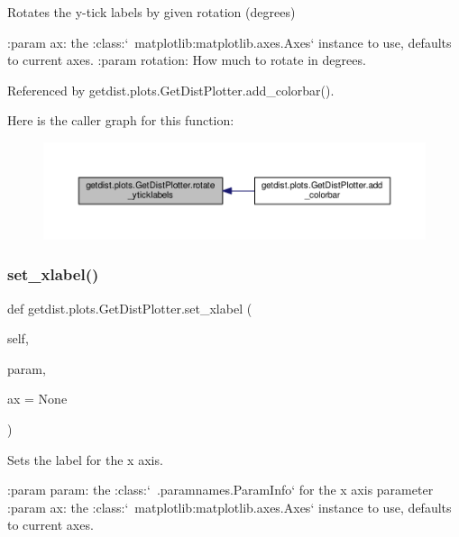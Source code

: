 \begin{DoxyVerb}Rotates the y-tick labels by given rotation (degrees)

:param ax: the :class:`~matplotlib:matplotlib.axes.Axes` instance to use, defaults to current axes.
:param rotation: How much to rotate in degrees.
\end{DoxyVerb}
 

Referenced by getdist.\+plots.\+Get\+Dist\+Plotter.\+add\+\_\+colorbar().

Here is the caller graph for this function\+:
\nopagebreak
\begin{figure}[H]
\begin{center}
\leavevmode
\includegraphics[width=350pt]{classgetdist_1_1plots_1_1GetDistPlotter_a695a45a9dff3c9be3b44d4b652dfc2df_icgraph}
\end{center}
\end{figure}
\mbox{\label{classgetdist_1_1plots_1_1GetDistPlotter_a307e4b542216e36e71550a6d34a36f49}} 
\subsubsection{\texorpdfstring{set\+\_\+xlabel()}{set\_xlabel()}}
{\footnotesize\ttfamily def getdist.\+plots.\+Get\+Dist\+Plotter.\+set\+\_\+xlabel (\begin{DoxyParamCaption}\item[{}]{self,  }\item[{}]{param,  }\item[{}]{ax = {\ttfamily None} }\end{DoxyParamCaption})}

\begin{DoxyVerb}Sets the label for the x axis.

:param param: the :class:`~.paramnames.ParamInfo` for the x axis parameter
:param ax: the :class:`~matplotlib:matplotlib.axes.Axes` instance to use, defaults to current axes.
\end{DoxyVerb}
 


